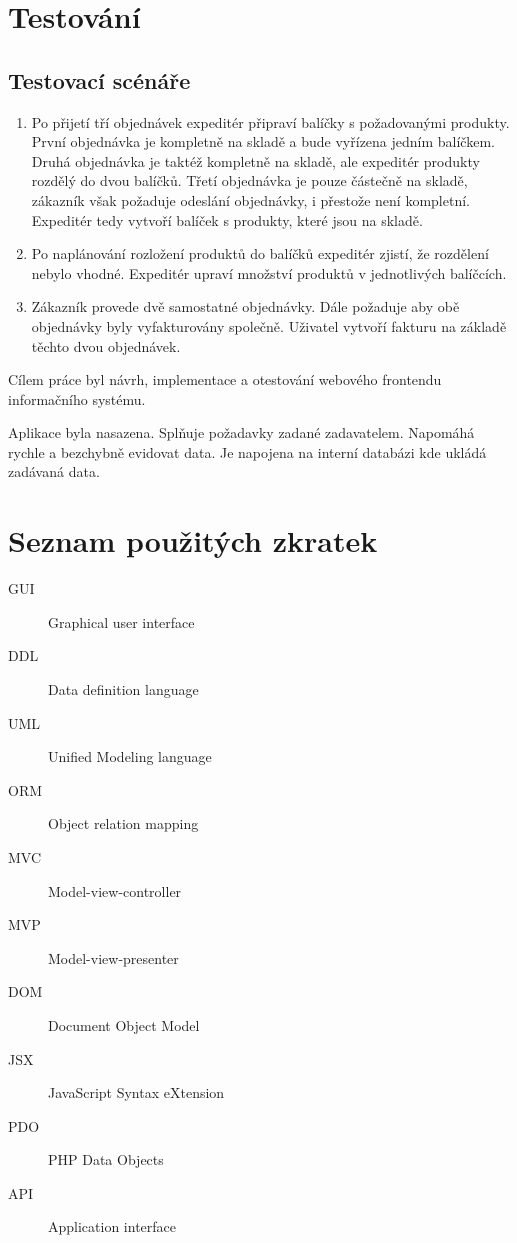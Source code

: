 \documentclass[thesis=B,czech]{FITthesis}[2012/06/26]
\begin{document}
\chapter{Testování}

\section{Testovací scénáře}
	\begin{enumerate}
		\item Po přijetí tří objednávek expeditér připraví balíčky s požadovanými produkty. První objednávka je kompletně na skladě a bude vyřízena jedním balíčkem. Druhá objednávka je taktéž kompletně na skladě, ale expeditér produkty rozdělý do dvou balíčků. Třetí objednávka je pouze částečně na skladě, zákazník však požaduje odeslání objednávky, i přestože není kompletní. Expeditér tedy vytvoří balíček s produkty, které jsou na skladě.
		\item Po naplánování rozložení produktů do balíčků expeditér zjistí, že rozdělení nebylo vhodné. Expeditér upraví množství produktů v jednotlivých balíčcích.
		\item Zákazník provede dvě samostatné objednávky. Dále požaduje aby obě objednávky byly vyfakturovány společně. Uživatel vytvoří fakturu na základě těchto dvou objednávek.
	\end{enumerate}

\begin{conclusion}
	Cílem práce byl návrh, implementace a otestování webového frontendu informačního systému.
	
	Aplikace byla nasazena. Splňuje požadavky zadané zadavatelem. Napomáhá rychle a bezchybně evidovat data. Je napojena na interní databázi kde ukládá zadávaná data.
\end{conclusion}




\appendix

\chapter{Seznam použitých zkratek}
\begin{description}
	\item[GUI] Graphical user interface
	\item[DDL] Data definition language
	\item[UML] Unified Modeling language
	\item[ORM] Object relation mapping
	\item[MVC] Model-view-controller
	\item[MVP] Model-view-presenter
	\item[DOM] Document Object Model
	\item[JSX] JavaScript Syntax eXtension
	\item[PDO] PHP Data Objects
	\item[API] Application interface
\end{description}
\end{document}
